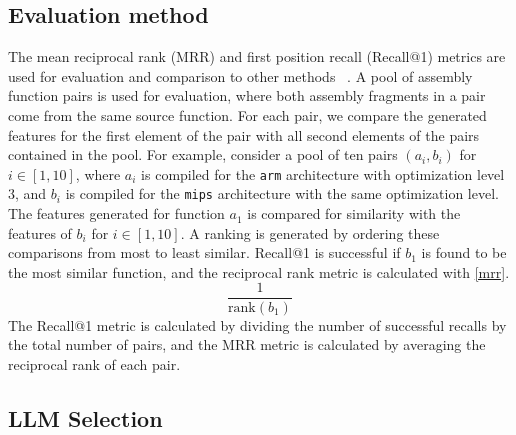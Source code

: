 \subsection{Evaluation method}

The mean reciprocal rank (MRR) and first position recall (Recall@1) metrics are used for evaluation and comparison to other methods
~\cite{deprio,code-not-lang,Asm2Vec,CLAP,SAFE}.
A pool of assembly function pairs is used for evaluation, where both assembly fragments in a pair come from the same source function.
For each pair, we compare the generated features for the first element of the pair with all second elements of the pairs contained
in the pool.  For example, consider a pool of ten pairs \((a_i, b_i)\) for \(i \in [1, 10]\), where \(a_i\) is compiled for the \texttt{arm}
architecture with optimization level \(3\), and \(b_i\) is compiled for the \texttt{mips} architecture with the same optimization
level. The features generated for function \(a_1\) is compared for similarity with the features of \(b_i\) for \(i \in [1, 10]\).
A ranking is generated by ordering these comparisons from most to least similar. Recall@1 is successful
if \(b_1\) is found to be the most similar function, and the reciprocal rank metric is calculated with \autoref{mrr}.
\begin{equation} \label{mrr}
\frac{1}{\text{rank}(b_1)}
\end{equation}
\noindent The Recall@1 metric is calculated by dividing the number of successful recalls by the total number of pairs, and the
MRR metric is calculated by averaging the reciprocal rank of each pair.

\subsection{LLM Selection}

